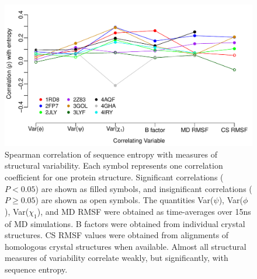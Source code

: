 \documentclass[smallextended]{svjour3}
\begin{document}
\begin{figure}[tbh]
\begin{center}
    \includegraphics[width=5in]{cor_entropy_SF.pdf} %
\end{center}
\caption{Spearman correlation of sequence entropy with measures of structural variability. Each symbol represents one correlation coefficient for one protein structure. Significant correlations ($P<0.05$) are shown as filled symbols, and insignificant correlations ($P\geq0.05$) are shown as open symbols. The quantities Var($\psi$), Var($\phi$), Var($\chi_1$), and MD RMSF were obtained as time-averages over 15ns of MD simulations. B factors were obtained from individual crystal structures. CS RMSF values were obtained from alignments of homologous crystal structures when available. Almost all structural measures of variability correlate weakly, but significantly, with sequence entropy.}
\label{fig:cor_entropy_SF}
\end{figure}
\end{document}
